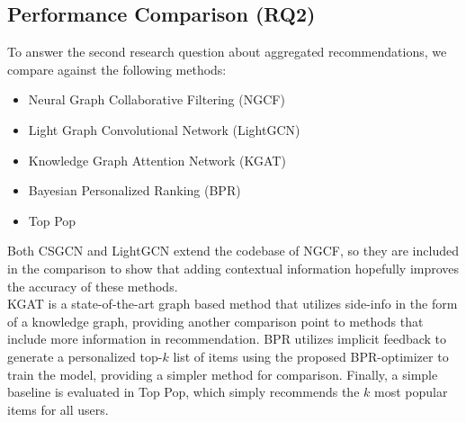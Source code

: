 
\subsection{Performance Comparison (RQ2)}
To answer the second research question about aggregated recommendations, we compare against the following methods:
\begin{itemize}
    \item Neural Graph Collaborative Filtering (NGCF) \cite{NGCF}
    \item Light Graph Convolutional Network (LightGCN) \cite{LightGCN}
    \item Knowledge Graph Attention Network (KGAT) \cite{KGAT}
    \item Bayesian Personalized Ranking (BPR) \cite{BPR}
    \item Top Pop
\end{itemize}
Both CSGCN and LightGCN extend the codebase of NGCF, so they are included in the comparison to show that adding contextual information hopefully improves the accuracy of these methods.\\
KGAT is a state-of-the-art graph based method that utilizes side-info in the form of a knowledge graph, providing another comparison point to methods that include more information in recommendation.
BPR utilizes implicit feedback to generate a personalized top-$k$ list of items using the proposed BPR-optimizer to train the model, providing a simpler method for comparison.
Finally, a simple baseline is evaluated in Top Pop, which simply recommends the $k$ most popular items for all users.
